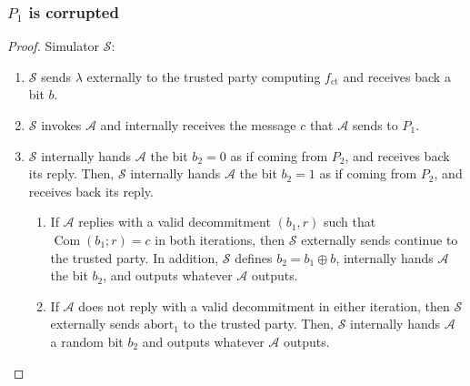 \documentclass{beamer}
\begin{document}
    \begin{frame}
        \frametitle{$P_{1}$ is corrupted}
        \begin{proof}
            Simulator $\mathcal{S}$:
            \begin{enumerate}
                \item $\mathcal{S}$ sends $\lambda$ externally to the trusted party computing $f_{\mathrm{ct}}$ and receives back a bit $b$.
                \item $\mathcal{S}$ invokes $\mathcal{A}$ and internally receives the message $c$ that $\mathcal{A}$ sends to $P_{1}$.
                \item $\mathcal{S}$ internally hands $\mathcal{A}$ the bit $b_{2}=0$ as if coming from $P_{2}$, and receives back its reply. Then, $\mathcal{S}$ internally hands $\mathcal{A}$ the bit $b_{2}=1$ as if coming from $P_{2}$, and receives back its reply. 
                \begin{enumerate}[a]
                    \item If $\mathcal{A}$ replies with a valid decommitment $\left(b_{1}, r\right)$ such that $\operatorname{Com}\left(b_{1} ; r\right)=c$ in both iterations, then $\mathcal{S}$ externally sends $\mathrm{continue}$ to the trusted party. In addition, $\mathcal{S}$ defines $b_{2}=b_{1} \oplus b$, internally hands $\mathcal{A}$ the bit $b_{2}$, and outputs whatever $\mathcal{A}$ outputs.
                    \item If $\mathcal{A}$ does not reply with a valid decommitment in either iteration, then $\mathcal{S}$ externally sends $\mathrm{abort}_{1}$ to the trusted party. Then, $\mathcal{S}$ internally hands $\mathcal{A}$ a random bit $b_{2}$ and outputs whatever $\mathcal{A}$ outputs.
                    
                \end{enumerate}
            \end{enumerate}
            
        \end{proof}
    

    
    \end{frame}
\end{document}
